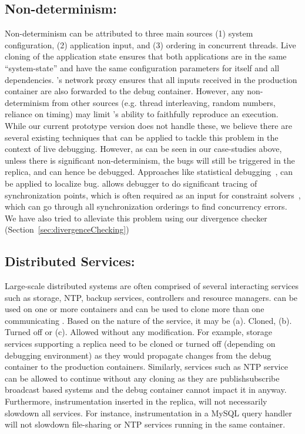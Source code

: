 \subsection{Non-determinism:} 
Non-determinism can be attributed to three main sources (1) system configuration, (2) application input, and (3) ordering in concurrent threads.
Live cloning of the application state ensures that both applications are in the same ``system-state'' and have the same configuration parameters for itself and all dependencies.
\parikshan's network proxy ensures that all inputs received in the production container are also forwarded to the debug container.
However, any non-determinism from other sources (e.g. thread interleaving, random numbers, reliance on timing) may limit \parikshan's ability to faithfully reproduce an execution. 
While our current prototype version does not handle these, we believe there are several existing techniques that can be applied to tackle this problem in the context of live debugging.
However, as can be seen in our case-studies above, unless there is significant non-determinism, the bugs will still be triggered in the replica, and can hence be debugged. 
Approaches like statistical debugging~\cite{Liblit:2004:CBI}, can be applied to localize bug.
\parikshan allows debugger to do significant tracing of synchronization points, which is often required as an input for constraint solvers~\cite{dpor,best}, which can go through all synchronization orderings to find concurrency errors.
We have also tried to alleviate this problem using our divergence checker (Section~\ref{sec:divergenceChecking})


\subsection{Distributed Services:} Large-scale distributed systems are often comprised of several interacting services such as storage, NTP, backup services, controllers and resource managers.
\parikshan can be used on one or more containers and can be used to clone more than one communicating .
Based on the nature of the service, it may be (a). Cloned, (b). Turned off or (c). Allowed without any modification.
For example, storage services supporting a replica need to be cloned or turned off (depending on debugging environment) as they would propagate changes from the debug container to the production containers.
Similarly, services such as NTP service can be allowed to continue without any cloning as they are publish\/subscribe broadcast based systems and the debug container cannot impact it in anyway.
Furthermore, instrumentation inserted in the replica, will not necessarily slowdown all services.
For instance, instrumentation in a MySQL query handler will not slowdown file-sharing or NTP services running in the same container.
